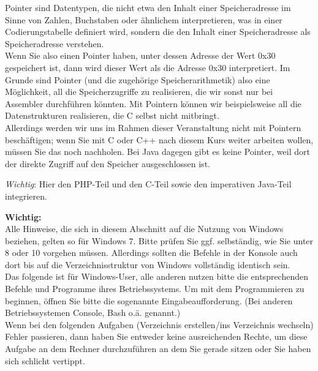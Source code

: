 Pointer sind Datentypen, die nicht etwa den Inhalt einer Speicheradresse im Sinne von Zahlen, Buchstaben oder ähnlichem interpretieren, was in einer Codierungstabelle definiert wird, sondern die den Inhalt einer Speicheradresse als Speicheradresse verstehen.\\

Wenn Sie also einen Pointer haben, unter dessen Adresse der Wert 0x30 gespeichert ist, dann wird dieser Wert als die Adresse 0x30 \glqq{}interpretiert\grqq{}. Im Grunde sind Pointer (und die zugehörige Speicherarithmetik) also eine Möglichkeit, all die Speicherzugriffe zu realisieren, die wir sonst nur bei Assembler durchführen könnten. Mit Pointern können wir beispielsweise all die Datenstrukturen realisieren, die C selbst nicht mitbringt.\\

Allerdings werden wir uns im Rahmen dieser Veranstaltung nicht mit Pointern beschäftigen; wenn Sie mit C oder C++ nach diesem Kurs weiter arbeiten wollen, müssen Sie das noch nachholen. Bei Java dagegen gibt es keine Pointer, weil dort der direkte Zugriff auf den Speicher ausgeschlossen ist.












\emph{Wichtig}: Hier den PHP-Teil und den C-Teil sowie den imperativen Java-Teil integrieren.






\textbf{Wichtig:}\\

Alle Hinweise, die sich in diesem Abschnitt auf die Nutzung von Windows beziehen, gelten so für Windows 7. Bitte prüfen Sie ggf. selbständig, wie Sie unter 8 oder 10 vorgehen müssen. Allerdings sollten die Befehle in der Konsole auch dort bis auf die Verzeichnisstruktur von Windows vollständig identisch sein.\\

Das folgende ist für Windows-User, alle anderen nutzen bitte die entsprechenden Befehle und Programme ihres Betriebssystems. Um mit dem Programmieren zu beginnen, öffnen Sie bitte die sogenannte Eingabeaufforderung. (Bei anderen Betriebssystemen Console, Bash o.ä. genannt.)\\

Wenn bei den folgenden Aufgaben (Verzeichnis erstellen/ins Verzeichnis wechseln) Fehler passieren, dann haben Sie entweder keine ausreichenden Rechte, um diese Aufgabe an dem Rechner durchzuführen an dem Sie gerade sitzen oder Sie haben sich schlicht vertippt.\\

